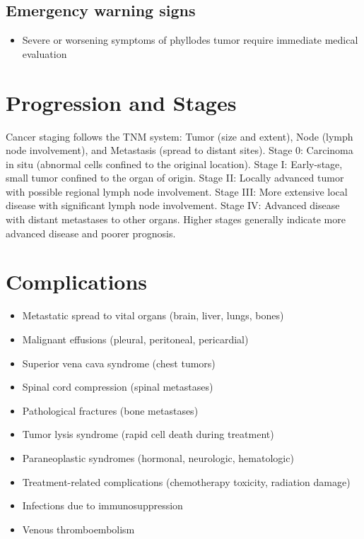 \subsection{Emergency warning signs}
\begin{itemize}[noitemsep]
  \item Severe or worsening symptoms of phyllodes tumor require immediate medical evaluation
\end{itemize}
\section{Progression and Stages}
Cancer staging follows the TNM system: Tumor (size and extent), Node (lymph node involvement), and Metastasis (spread to distant sites). Stage 0: Carcinoma in situ (abnormal cells confined to the original location). Stage I: Early-stage, small tumor confined to the organ of origin. Stage II: Locally advanced tumor with possible regional lymph node involvement. Stage III: More extensive local disease with significant lymph node involvement. Stage IV: Advanced disease with distant metastases to other organs. Higher stages generally indicate more advanced disease and poorer prognosis.
\section{Complications}
\begin{itemize}[noitemsep]
  \item Metastatic spread to vital organs (brain, liver, lungs, bones)
  \item Malignant effusions (pleural, peritoneal, pericardial)
  \item Superior vena cava syndrome (chest tumors)
  \item Spinal cord compression (spinal metastases)
  \item Pathological fractures (bone metastases)
  \item Tumor lysis syndrome (rapid cell death during treatment)
  \item Paraneoplastic syndromes (hormonal, neurologic, hematologic)
  \item Treatment-related complications (chemotherapy toxicity, radiation damage)
  \item Infections due to immunosuppression
  \item Venous thromboembolism
\end{itemize}

